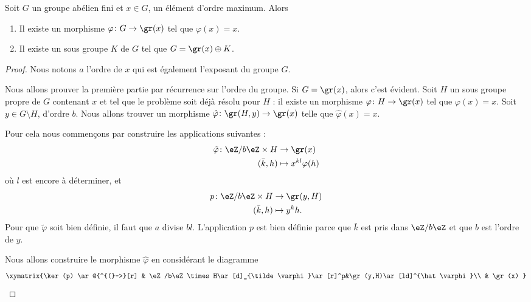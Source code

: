 \begin{proposition} \label{PropfPRVxi}
    Soit \( G\) un groupe abélien fini et \( x\in G\), un élément d'ordre maximum. Alors
    \begin{enumerate}
        \item
            Il existe un morphisme \( \varphi\colon G\to \gr(x)\) tel que \( \varphi(x)=x\).
        \item   \label{ItemKRYwjU}
            Il existe un sous groupe \( K\) de \( G\) tel que \( G=\gr(x)\oplus K\).
    \end{enumerate}
\end{proposition}

\begin{proof}
    Nous notons \( a\) l'ordre de \( x\) qui est également l'exposant du groupe \( G\).

    Nous allons prouver la première partie par récurrence sur l'ordre du groupe. Si \( G=\gr(x)\), alors c'est évident. Soit \( H\) un sous groupe propre de \( G\) contenant \( x\) et tel que le problème soit déjà résolu pour \( H\) : il existe un morphisme \( \varphi\colon H\to \gr(x)\) tel que \( \varphi(x)=x\). Soit \( y\in G\setminus H\), d'ordre \( b\). Nous allons trouver un morphisme $\hat\varphi\colon \gr(H,y)\to \gr(x) $ telle que \( \hat\varphi(x)=x\).

    Pour cela nous commençons par construire les applications suivantes :
    \begin{equation}
        \begin{aligned}
            \tilde \varphi\colon \eZ/b\eZ\times H&\to \gr(x) \\
            (\bar k,h)&\mapsto x^{kl}\varphi(h) 
        \end{aligned}
    \end{equation}
    où \( l\) est encore à déterminer, et
    \begin{equation}
        \begin{aligned}
            p\colon \eZ/b\eZ\times H&\to \gr(y,H) \\
            (\bar k,h)&\mapsto y^kh. 
        \end{aligned}
    \end{equation}
    Pour que \( \tilde \varphi\) soit bien définie, il faut que \( a\) divise \( bl\). L'application \( p\) est bien définie parce que \( \bar k\) est pris dans \( \eZ/b\eZ\) et que \( b\) est l'ordre de \( y\).

    Nous allons construire le morphisme \( \hat \varphi\) en considérant le diagramme 
    \begin{equation}
    \xymatrix{%
    \ker(p) \ar@{^{(}->}[r]        &   \eZ/b\eZ\times H\ar[d]_{\tilde \varphi}\ar[r]^p&\gr(y,H)\ar[ld]^{\hat \varphi}\\
          &   \gr(x)
       }
    \end{equation}


\end{proof}
